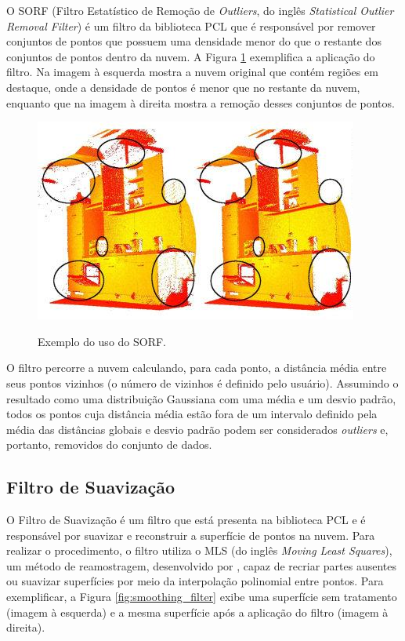 O SORF (Filtro Estatístico de Remoção de \textit{Outliers}, do inglês \textit{Statistical Outlier Removal Filter}) é um filtro da biblioteca PCL que é responsável por remover conjuntos de pontos que possuem uma densidade menor do que o restante dos conjuntos de pontos dentro da nuvem. 
A Figura \ref{fig:outlier_filter} exemplifica a aplicação do filtro. Na imagem à esquerda mostra a nuvem original que contém regiões em destaque, onde a densidade de pontos é menor que no restante da nuvem, enquanto que na imagem à direita mostra a remoção desses conjuntos de pontos.

\begin{figure}[H]
    \centering
    \caption{Exemplo do uso do SORF.}
    \includegraphics[scale=0.6]{dados/figuras/outlier_filter.jpg}
    \label{fig:outlier_filter}
\end{figure}

O filtro percorre a nuvem calculando, para cada ponto, a distância média entre seus pontos vizinhos (o número de vizinhos é definido pelo usuário). Assumindo o resultado como uma distribuição Gaussiana com uma média e um desvio padrão, todos os pontos cuja distância média estão fora de um intervalo definido pela média das distâncias globais e desvio padrão podem ser considerados \textit{outliers} e, portanto, removidos do conjunto de dados.

\subsection{Filtro de Suavização}
\label{sec:smoothing_filter}

O Filtro de Suavização é um filtro que está presenta na biblioteca PCL e é responsável por suavizar e reconstruir a superfície de pontos na nuvem. 
Para realizar o procedimento, o filtro utiliza o MLS (do inglês \textit{Moving Least Squares}), um método de reamostragem, desenvolvido por \cite{levin1998mls}, capaz de recriar partes ausentes ou suavizar superfícies por meio da interpolação polinomial entre pontos. 
Para exemplificar, a Figura \ref{fig:smoothing_filter} exibe uma superfície sem tratamento (imagem à esquerda) e a mesma superfície após a aplicação do filtro (imagem à direita).

